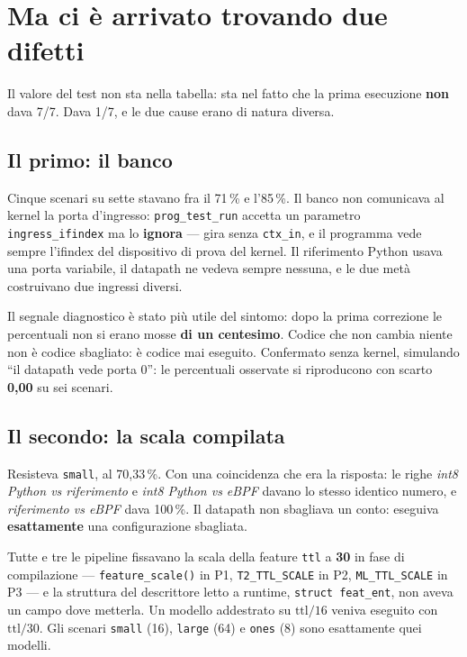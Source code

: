 \documentclass[11pt,a4paper,oneside]{report}
\begin{document}
\section{Ma ci è arrivato trovando due difetti}

Il valore del test non sta nella tabella: sta nel fatto che la prima esecuzione
\textbf{non} dava 7/7. Dava 1/7, e le due cause erano di natura diversa.

\subsection*{Il primo: il banco}

Cinque scenari su sette stavano fra il 71\,\% e l'85\,\%. Il banco non
comunicava al kernel la porta d'ingresso: \texttt{prog\_test\_run} accetta un
parametro \texttt{ingress\_ifindex} ma lo \textbf{ignora} --- gira senza
\texttt{ctx\_in}, e il programma vede sempre l'ifindex del dispositivo di prova
del kernel. Il riferimento Python usava una porta variabile, il datapath ne
vedeva sempre nessuna, e le due metà costruivano due ingressi diversi.

Il segnale diagnostico è stato più utile del sintomo: dopo la prima correzione
le percentuali non si erano mosse \textbf{di un centesimo}. Codice che non
cambia niente non è codice sbagliato: è codice mai eseguito. Confermato senza
kernel, simulando ``il datapath vede porta 0'': le percentuali osservate si
riproducono con scarto \textbf{0,00} su sei scenari.

\subsection*{Il secondo: la scala compilata}

Resisteva \texttt{small}, al 70,33\,\%. Con una coincidenza che era la
risposta: le righe \emph{int8 Python vs riferimento} e \emph{int8 Python vs
eBPF} davano lo stesso identico numero, e \emph{riferimento vs eBPF} dava
100\,\%. Il datapath non sbagliava un conto: eseguiva \textbf{esattamente} una
configurazione sbagliata.

Tutte e tre le pipeline fissavano la scala della feature \texttt{ttl} a
\textbf{30} in fase di compilazione --- \texttt{feature\_scale()} in P1,
\texttt{T2\_TTL\_SCALE} in P2, \texttt{ML\_TTL\_SCALE} in P3 --- e la struttura
del descrittore letto a runtime, \texttt{struct feat\_ent}, non aveva un campo
dove metterla. Un modello addestrato su $\text{ttl}/16$ veniva eseguito con
$\text{ttl}/30$. Gli scenari \texttt{small} (16), \texttt{large} (64) e
\texttt{ones} (8) sono esattamente quei modelli.
\end{document}
